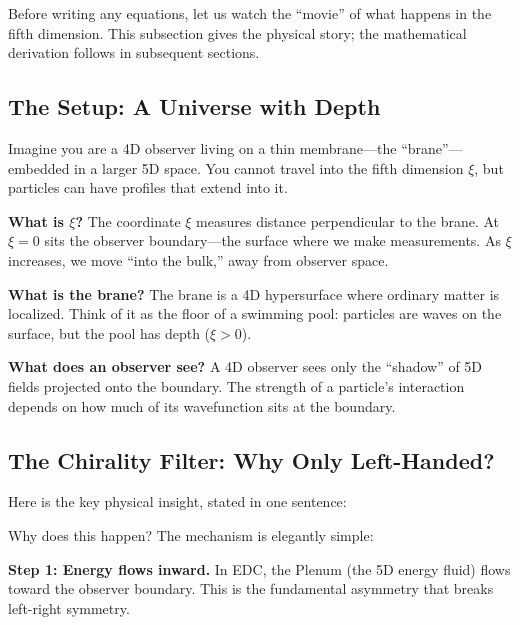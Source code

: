 \medskip
Before writing any equations, let us watch the ``movie'' of what happens in the
fifth dimension. This subsection gives the physical story; the mathematical
derivation follows in subsequent sections.


\subsection{The Setup: A Universe with Depth}

Imagine you are a 4D observer living on a thin membrane---the ``brane''---embedded
in a larger 5D space. You cannot travel into the fifth dimension $\xi$, but particles
can have profiles that extend into it.

\textbf{What is $\xi$?} The coordinate $\xi$ measures distance perpendicular to the
brane. At $\xi = 0$ sits the observer boundary---the surface where we make measurements.
As $\xi$ increases, we move ``into the bulk,'' away from observer space.

\textbf{What is the brane?} The brane is a 4D hypersurface where ordinary matter
is localized. Think of it as the floor of a swimming pool: particles are waves
on the surface, but the pool has depth ($\xi > 0$).

\textbf{What does an observer see?} A 4D observer sees only the ``shadow'' of
5D fields projected onto the boundary. The strength of a particle's interaction
depends on how much of its wavefunction sits at the boundary.


\subsection{The Chirality Filter: Why Only Left-Handed?}

Here is the key physical insight, stated in one sentence:

\begin{center}
\end{center}

Why does this happen? The mechanism is elegantly simple:

\textbf{Step 1: Energy flows inward.} In EDC, the Plenum (the 5D energy fluid)
flows toward the observer boundary. This is the fundamental asymmetry that
breaks left-right symmetry.

